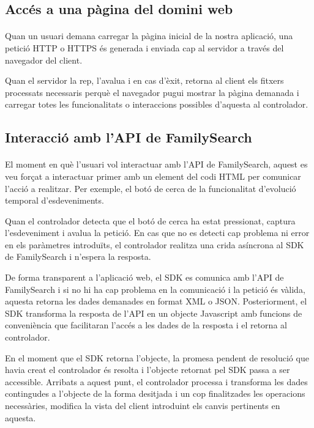    \subsection{Accés a una pàgina del domini web}

    \paragraph{}
    Quan un usuari demana carregar la pàgina inicial de la nostra aplicació, una petició HTTP o HTTPS és generada i enviada cap al servidor a través del navegador del client.

    Quan el servidor la rep, l'avalua i en cas d'èxit, retorna al client els fitxers processats necessaris perquè el navegador pugui mostrar la pàgina demanada i carregar totes les funcionalitats o interaccions possibles d'aquesta al controlador.


    \subsection{Interacció amb l'API de FamilySearch}

    \paragraph{}
    El moment en què l'usuari vol interactuar amb l'API de FamilySearch, aquest es veu forçat a interactuar primer amb un element del codi HTML per comunicar l’acció a realitzar. Per exemple, el botó de cerca de la funcionalitat d'evolució temporal d'esdeveniments.

    Quan el controlador detecta que el botó de cerca ha estat pressionat, captura l'esdeveniment i avalua la petició. En cas que no es detecti cap problema ni error en els paràmetres introduïts, el controlador realitza una crida asíncrona al SDK de FamilySearch i n'espera la resposta.

    De forma transparent a l'aplicació web, el SDK es comunica amb l’API de FamilySearch i si no hi ha cap problema en la comunicació i la petició és vàlida, aquesta retorna les dades demanades en format XML o JSON. Posteriorment, el SDK transforma la resposta de l’API en un objecte Javascript amb funcions de conveniència que facilitaran l'accés a les dades de la resposta i el retorna al controlador.

    En el moment que el SDK retorna l'objecte, la promesa pendent de resolució que havia creat el controlador és resolta i l'objecte retornat pel SDK passa a ser accessible. Arribats a aquest punt, el controlador processa i transforma les dades contingudes a l'objecte de la forma desitjada i un cop finalitzades les operacions necessàries, modifica la vista del client introduint els canvis pertinents en aquesta.


